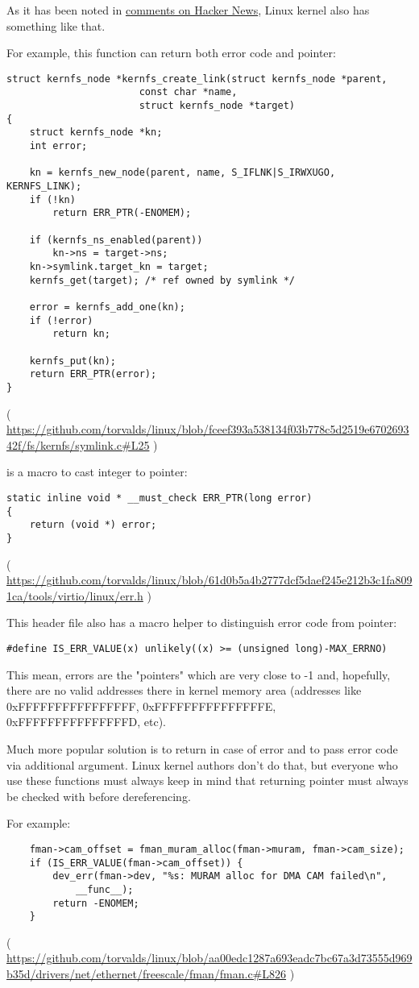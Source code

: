 As it has been noted in \href{https://news.ycombinator.com/item?id=11823647}{comments on Hacker News}, Linux kernel also has something like that.

For example, this function can return both error code and pointer:

\begin{lstlisting}
struct kernfs_node *kernfs_create_link(struct kernfs_node *parent,
				       const char *name,
				       struct kernfs_node *target)
{
	struct kernfs_node *kn;
	int error;

	kn = kernfs_new_node(parent, name, S_IFLNK|S_IRWXUGO, KERNFS_LINK);
	if (!kn)
		return ERR_PTR(-ENOMEM);

	if (kernfs_ns_enabled(parent))
		kn->ns = target->ns;
	kn->symlink.target_kn = target;
	kernfs_get(target);	/* ref owned by symlink */

	error = kernfs_add_one(kn);
	if (!error)
		return kn;

	kernfs_put(kn);
	return ERR_PTR(error);
}
\end{lstlisting}

( \url{https://github.com/torvalds/linux/blob/fceef393a538134f03b778c5d2519e670269342f/fs/kernfs/symlink.c#L25} )

 is a macro to cast integer to pointer:

\begin{lstlisting}
static inline void * __must_check ERR_PTR(long error)
{
	return (void *) error;
}
\end{lstlisting}

( \url{https://github.com/torvalds/linux/blob/61d0b5a4b2777dcf5daef245e212b3c1fa8091ca/tools/virtio/linux/err.h} )

This header file also has a macro helper to distinguish error code from pointer:

\begin{lstlisting}
#define IS_ERR_VALUE(x) unlikely((x) >= (unsigned long)-MAX_ERRNO)
\end{lstlisting}

This mean, errors are the "pointers" which are very close to -1 and, hopefully, there are no valid addresses there in kernel memory area 
(addresses like 0xFFFFFFFFFFFFFFFF, 0xFFFFFFFFFFFFFFFE, 0xFFFFFFFFFFFFFFFD, etc).

Much more popular solution is to return  in case of error and to pass error code via additional argument.
Linux kernel authors don't do that, but everyone who use these functions must always keep in mind that returning pointer
must always be checked with  before dereferencing.

For example:

\begin{lstlisting}
	fman->cam_offset = fman_muram_alloc(fman->muram, fman->cam_size);
	if (IS_ERR_VALUE(fman->cam_offset)) {
		dev_err(fman->dev, "%s: MURAM alloc for DMA CAM failed\n",
			__func__);
		return -ENOMEM;
	}
\end{lstlisting}

( \url{https://github.com/torvalds/linux/blob/aa00edc1287a693eadc7bc67a3d73555d969b35d/drivers/net/ethernet/freescale/fman/fman.c#L826} )

